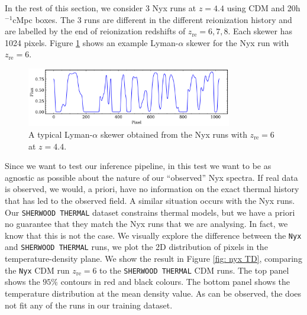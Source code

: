 In the rest of this section, we consider 3 Nyx runs at $z=4.4$ using CDM and 20h$^{-1}$cMpc boxes. The 3 runs are different in the different reionization history and are labelled by the end of reionization redshifts of $z_\mathrm{re}=6,7,8$. Each skewer has 1024 pixels. Figure \ref{fig: nyx skewer} shows an example Lyman-$\alpha$ skewer for the Nyx run with $z_\mathrm{re}=6$.


\begin{figure}
    \centering
    \includegraphics[width=0.8\textwidth]{img/ML/nyx_skewer.png}
    \caption{A typical Lyman-$\alpha$ skewer obtained from the Nyx runs with $z_\mathrm{re}=6$ at $z=4.4$.}
    \label{fig: nyx skewer}
\end{figure}
Since we want to test our inference pipeline, in this test we want to be as agnostic as possible about the nature of our ``observed'' Nyx spectra. If real data is observed, we would, a priori, have no information on the exact thermal history that has led to the observed field. A similar situation occurs with the Nyx runs. Our \texttt{SHERWOOD THERMAL} dataset constrains thermal models, but we have a priori no guarantee that they match the Nyx runs that we are analysing. In fact, we know that this is not the case. We visually explore the difference between the \texttt{Nyx} and \texttt{SHERWOOD THERMAL} runs, we plot the 2D distribution of pixels in the temperature-density plane. We show the result in Figure \ref{fig: nyx TD}, comparing the \texttt{Nyx} CDM run $z_\mathrm{re}=6$ to the \texttt{SHERWOOD THERMAL} CDM runs. The top panel shows the $95\%$ contours in red and black colours. The bottom panel shows the temperature distribution at the mean density value. As can be observed, the  does not fit any of the runs in our training dataset.


